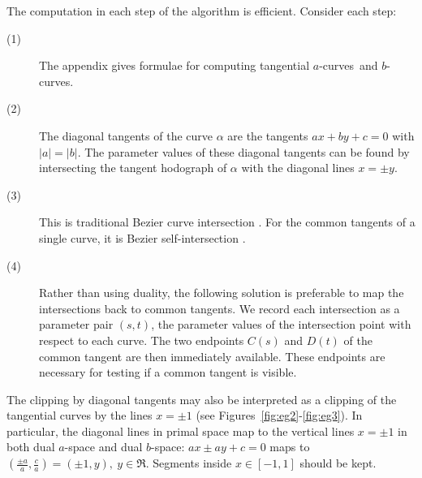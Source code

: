 \documentclass[10pt,twocolumn]{article}
\newif\ifJournal
\newcommand{\atangs}{tangential $a$-curves\ }
\begin{document}
The computation in each step of the algorithm is efficient.
Consider each step:
%
\begin{description}
\item[(1)] The appendix gives formulae for computing \atangs and $b$-curves.
\item[(2)] The diagonal tangents of the curve $\alpha$ are the 
	   tangents $ax+by+c=0$ with $|a|=|b|$.
	The parameter values of these diagonal tangents
	can be found by intersecting the tangent hodograph %
	of $\alpha$ with the diagonal lines $x=\pm y$.
\item[(3)] This is traditional Bezier curve intersection \cite{sederberg86}.
	For the common tangents of a single curve, it is Bezier self-intersection
	\cite{lasser89}.
\item[(4)] Rather than using duality, the following solution is preferable
	to map the intersections back to common tangents. 
	We record each intersection as a parameter pair $(s,t)$,
	the parameter values of the intersection point with respect to each curve.
	The two endpoints $C(s)$ and $D(t)$ of the common tangent are then immediately 
	available.
	These endpoints are necessary for testing if a common tangent is visible.
\end{description}

The clipping by diagonal tangents may also be interpreted
as a clipping of the tangential curves by the lines $x = \pm 1$
(see Figures~\ref{fig:eg2}-\ref{fig:eg3}).
In particular, the diagonal lines in primal space map to the vertical lines
$x = \pm 1$ in both dual $a$-space and dual $b$-space:
$ax \pm ay + c=0$ maps to $(\frac{\pm a}{a},\frac{c}{a}) = (\pm 1,y),\ y \in \Re$.
Segments inside $x \in [-1,1]$ should be kept.

\ifJournal
THIS IS THE FORMULA FOR C-CURVES (NOT A- or B-CURVES).
Note that if one wants to use duality
to map points of dual space to lines in primal space,
care must be taken to work in projective space.
If the intersection point is $C^*(t) = (c_1,c_2)$ and the weight function 
of the rational Bezier curve $C^*(t)$ at
this parameter value is $c_3$, the coordinates of the intersection
in projective dual space are $(c_3 c_1, c_3 c_2, c_3)$
and the associated line in primal space is $c_3 c_1 x + c_3 c_2 y + c_3 = 0$.
\fi
\end{document}
